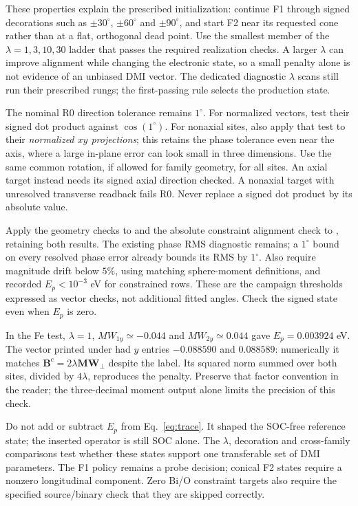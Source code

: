 \documentclass[11pt,a4paper]{article}
\numberwithin{equation}{section}
\newcommand{\vct}[1]{\bm{#1}}
\newcommand{\code}[1]{\texttt{\detokenize{#1}}}
\begin{document}
These properties explain the prescribed initialization: continue F1 through
signed decorations such as $\pm30^\circ$, $\pm60^\circ$ and $\pm90^\circ$,
and start F2 near its requested cone rather than at a flat, orthogonal
dead point. Use the smallest member of the $\lambda=1,3,10,30$ ladder that
passes the required realization checks. A larger $\lambda$ can improve
alignment while changing the electronic state, so a small penalty alone is
not evidence of an unbiased DMI vector.
The dedicated diagnostic $\lambda$ scans still run their prescribed rungs;
the first-passing rule selects the production state.

The nominal R0 direction tolerance remains $1^\circ$. For normalized
vectors, test their signed dot product against $\cos(1^\circ)$.
For nonaxial sites, also apply that test to their \emph{normalized $xy$
projections}; this retains the phase tolerance even near the axis,
where a large in-plane error can look small in three dimensions.
Use the same common rotation, if allowed for family geometry, for all
sites. An axial target instead needs its signed axial direction checked.
A nonaxial target with unresolved transverse readback fails R0.
Never replace a signed dot product by its absolute value.

Apply the geometry checks to \code{M_int} and the absolute constraint
alignment check to \code{MW_int}, retaining both results.
The existing phase RMS diagnostic remains; a $1^\circ$ bound on every
resolved phase error already bounds its RMS by $1^\circ$.
Also require magnitude drift below $5\%$, using matching sphere-moment
definitions, and recorded $E_p<10^{-3}$ eV for constrained rows.
These are the campaign thresholds~\cite{projectcp} expressed as vector
checks, not additional fitted angles. Check the signed state even when
$E_p$ is zero.

In the Fe test, $\lambda=1$, $MW_{1y}\simeq-0.044$ and
$MW_{2y}\simeq0.044$ gave $E_p=0.003924$ eV. The vector printed under
\code{lambda*MW_perp} had $y$ entries $-0.088590$ and $0.088589$:
numerically it matches $\vct B^c=2\lambda\vct{MW}_{\perp}$ despite the
label. Its squared norm summed over both sites, divided by $4\lambda$,
reproduces the penalty. Preserve that factor convention in the reader;
the three-decimal moment output alone limits the precision of this check.

Do not add or subtract $E_p$ from Eq.~\eqref{eq:trace}. It shaped the
SOC-free reference state; the inserted operator is still SOC alone.
The $\lambda$, decoration and cross-family comparisons test whether these
states support one transferable set of DMI parameters. The F1
\code{LZEROZ} policy remains a probe decision; conical F2 states require a
nonzero longitudinal component. Zero Bi/O constraint targets also require
the specified source/binary check that they are skipped correctly.
\end{document}

